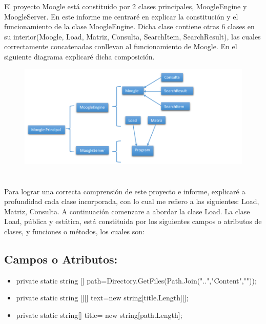\documentclass[a4paper,12pt]{article}
\begin{document}
El proyecto Moogle está constituido por 2 clases principales, MoogleEngine y MoogleServer. 
En este informe me centraré en explicar la constitución y el funcionamiento de la clase 
MoogleEngine. Dicha clase contiene otras 6 clases en su interior(Moogle, Load, Matriz, 
Consulta, SearchItem, SearchResult), las cuales correctamente concatenadas conllevan al 
funcionamiento de Moogle. En el siguiente diagrama explicaré dicha composición. 
\begin{figure}[h]
    \includegraphics*{Grafico 1.png}
    \end{figure}       
    \section*{}
        Para lograr una correcta comprensión de este proyecto e informe, explicaré a profundidad 
cada clase incorporada, con lo cual me refiero a las siguientes: Load, Matriz, Consulta. A 
continuación comenzare a abordar la clase Load.
La clase Load, pública y estática, está constituida por los siguientes campos o atributos de 
clases, y funciones o métodos, los cuales son:
\subsection*{Campos o Atributos:}
\begin{itemize}
    \item private static string [] path=Directory.GetFiles(Path.Join("..","Content",""));
    \item private static string [][] text=new string[title.Length][];  
    \item private static string[] title= new string[path.Length]; 
    
\end{itemize}
\end{document}
